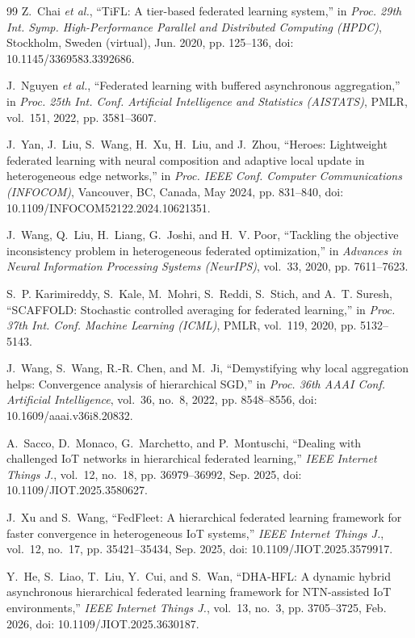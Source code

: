 \documentclass[conference]{IEEEtran}
\begin{document}
\begin{thebibliography}{99}
Z.~Chai \textit{et al.}, ``TiFL: A tier-based federated learning system,'' in \textit{Proc. 29th Int. Symp. High-Performance Parallel and Distributed Computing (HPDC)}, Stockholm, Sweden (virtual), Jun. 2020, pp. 125--136, doi: 10.1145/3369583.3392686.

J.~Nguyen \textit{et al.}, ``Federated learning with buffered asynchronous aggregation,'' in \textit{Proc. 25th Int. Conf. Artificial Intelligence and Statistics (AISTATS)}, PMLR, vol.~151, 2022, pp. 3581--3607.

J.~Yan, J.~Liu, S.~Wang, H.~Xu, H.~Liu, and J.~Zhou, ``Heroes: Lightweight federated learning with neural composition and adaptive local update in heterogeneous edge networks,'' in \textit{Proc. IEEE Conf. Computer Communications (INFOCOM)}, Vancouver, BC, Canada, May 2024, pp. 831--840, doi: 10.1109/INFOCOM52122.2024.10621351.

J.~Wang, Q.~Liu, H.~Liang, G.~Joshi, and H.~V. Poor, ``Tackling the objective inconsistency problem in heterogeneous federated optimization,'' in \textit{Advances in Neural Information Processing Systems (NeurIPS)}, vol.~33, 2020, pp. 7611--7623.

S.~P. Karimireddy, S.~Kale, M.~Mohri, S.~Reddi, S.~Stich, and A.~T. Suresh, ``SCAFFOLD: Stochastic controlled averaging for federated learning,'' in \textit{Proc. 37th Int. Conf. Machine Learning (ICML)}, PMLR, vol.~119, 2020, pp. 5132--5143.

J.~Wang, S.~Wang, R.-R. Chen, and M.~Ji, ``Demystifying why local aggregation helps: Convergence analysis of hierarchical SGD,'' in \textit{Proc. 36th AAAI Conf. Artificial Intelligence}, vol.~36, no.~8, 2022, pp. 8548--8556, doi: 10.1609/aaai.v36i8.20832.

A.~Sacco, D.~Monaco, G.~Marchetto, and P.~Montuschi, ``Dealing with challenged IoT networks in hierarchical federated learning,'' \textit{IEEE Internet Things J.}, vol.~12, no.~18, pp. 36979--36992, Sep. 2025, doi: 10.1109/JIOT.2025.3580627.

J.~Xu and S.~Wang, ``FedFleet: A hierarchical federated learning framework for faster convergence in heterogeneous IoT systems,'' \textit{IEEE Internet Things J.}, vol.~12, no.~17, pp. 35421--35434, Sep. 2025, doi: 10.1109/JIOT.2025.3579917.

Y.~He, S.~Liao, T.~Liu, Y.~Cui, and S.~Wan, ``DHA-HFL: A dynamic hybrid asynchronous hierarchical federated learning framework for NTN-assisted IoT environments,'' \textit{IEEE Internet Things J.}, vol.~13, no.~3, pp. 3705--3725, Feb. 2026, doi: 10.1109/JIOT.2025.3630187.


\end{thebibliography}
\end{document}
